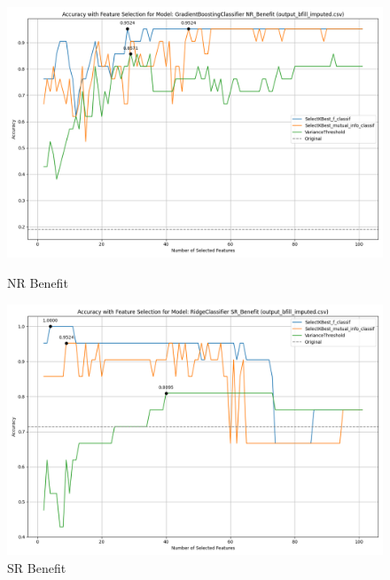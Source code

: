 \begin{figure}[H]
    \centering
    \begin{minipage}[b]{0.45\textwidth}
        \includegraphics[width=\textwidth]{class_all_section/images/feature_selection_accuracy_plot_output_bfill_imputedcsv_GradientBoostingClassifier_NR_Benefit.png}
        \caption{NR Benefit}
        \label{fig:nr_ben_class}
    \end{minipage}
    \hfill
    \begin{minipage}[b]{0.45\textwidth}
        \includegraphics[width=\textwidth]{class_all_section/images/feature_selection_accuracy_plot_output_bfill_imputedcsv_RidgeClassifier_SR_Benefit.png}
        \caption{SR Benefit}
        \label{fig:sr_ben_class}
    \end{minipage}
\end{figure}

